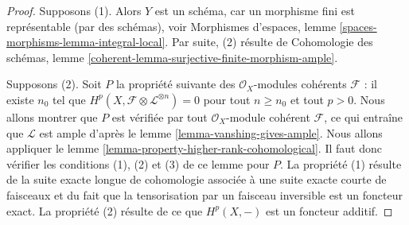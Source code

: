 \begin{proof}
Supposons (1). Alors $Y$ est un schéma, car un morphisme fini est représentable
(par des schémas), voir Morphismes d'espaces, lemme
\ref{spaces-morphisms-lemma-integral-local}. Par suite, (2)
résulte de Cohomologie des schémas, lemme
\ref{coherent-lemma-surjective-finite-morphism-ample}.

\medskip\noindent
Supposons (2). Soit $P$ la propriété suivante des
$\mathcal{O}_X$-modules cohérents $\mathcal{F}$ : il existe $n_0$
tel que $H^p(X, \mathcal{F} \otimes \mathcal{L}^{\otimes n}) = 0$
pour tout $n \geq n_0$ et tout $p > 0$. Nous allons montrer que $P$ est vérifiée
par tout $\mathcal{O}_X$-module cohérent $\mathcal{F}$, ce qui entraîne que
$\mathcal{L}$ est ample d'après le lemme \ref{lemma-vanshing-gives-ample}.
Nous allons appliquer le lemme \ref{lemma-property-higher-rank-cohomological}.
Il faut donc vérifier les conditions (1), (2) et (3) de ce lemme pour $P$.
La propriété (1) résulte de la suite exacte longue de cohomologie associée
à une suite exacte courte de faisceaux et du fait que la tensorisation par
un faisceau inversible est un foncteur exact. La propriété (2) résulte de ce que
$H^p(X, -)$ est un foncteur additif.


\end{proof}
